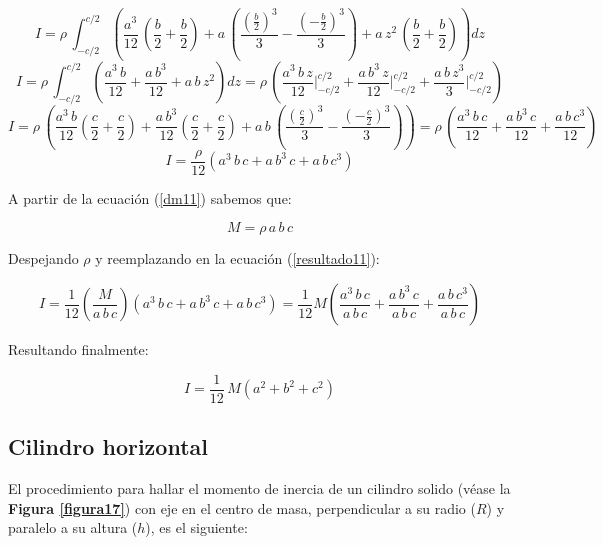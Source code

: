 \documentclass[letter,oneside,11pt]{article}
\begin{document}
\begin{equation*}
    I = \rho\, \int_{-c/2}^{c/2} \left( \frac{a^3}{12}\, \left( \frac{b}{2} + \frac{b}{2} \right) + a\, \left( \frac{(\frac{b}{2})^3}{3} - \frac{(-\frac{b}{2})^3}{3} \right) + a\, z^2\, \left( \frac{b}{2} + \frac{b}{2} \right) \right) dz
\end{equation*}
\begin{equation*}
    I = \rho\, \int_{-c/2}^{c/2} \left( \frac{a^3\, b}{12} + \frac{a\, b^3}{12} + a\, b\, z^2 \right) dz = \rho\, \left( \frac{a^3\, b\, z}{12} \Biggr|_{-c/2}^{c/2} + \frac{a\, b^3\, z}{12} \Biggr|_{-c/2}^{c/2} + \frac{a\, b\, z^3}{3} \Biggr|_{-c/2}^{c/2} \right)
\end{equation*}
\begin{equation*}
    I = \rho\, \left( \frac{a^3\, b}{12} \left( \frac{c}{2} + \frac{c}{2} \right) + \frac{a\, b^3}{12} \left( \frac{c}{2} + \frac{c}{2} \right) + a\, b\, \left( \frac{(\frac{c}{2})^3}{3} - \frac{(-\frac{c}{2})^3}{3} \right) \right) = \rho\, \left( \frac{a^3\, b\, c}{12} + \frac{a\, b^3\, c}{12} + \frac{a\, b\, c^3}{12} \right)
\end{equation*}
\begin{equation}
    I = \frac{\rho}{12} (a^3\, b\, c + a\, b^3\, c + a\, b\, c^3)
\label{resultado11}
\end{equation}

A partir de la ecuación (\ref{dm11}) sabemos que:

\begin{equation*}
    M = \rho\, a\, b\, c
\end{equation*}

Despejando $\rho$ y reemplazando en la ecuación (\ref{resultado11}):

\begin{equation*}
    I = \frac{1}{12} \left( \frac{M}{a\, b\, c} \right) (a^3\, b\, c + a\, b^3\, c + a\, b\, c^3) = \frac{1}{12} M \left( \frac{a^3\, b\, c}{a\, b\, c} + \frac{a\, b^3\, c}{a\, b\, c} + \frac{a\, b\, c^3}{a\, b\, c} \right)
\end{equation*}

Resultando finalmente:

\begin{equation}
    I = \frac{1}{12}\, M (a^2 + b^2 + c^2)
\end{equation}

\subsection{Cilindro horizontal}
El procedimiento para hallar el momento de inercia de un cilindro solido
(véase la \textbf{Figura \ref{figura17}}) con eje en el centro de masa,
perpendicular a su radio ($R$) y paralelo a su altura ($h$), es el siguiente:
\end{document}
